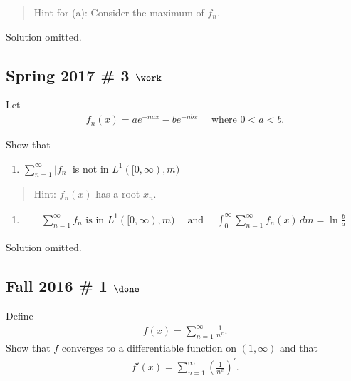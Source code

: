 \begin{quote}
Hint for (a): Consider the maximum of \(f_n\).
\end{quote}

Solution omitted.

\hypertarget{spring-2017-3-work}{%
\subsection{\texorpdfstring{Spring 2017 \# 3
\(\work\)}{Spring 2017 \# 3 \textbackslash work}}\label{spring-2017-3-work}}

Let
\begin{align*}
f_{n}(x) = a e^{-n a x} - b e^{-n b x} \quad \text{ where } 0 < a < b.
\end{align*}

Show that

\begin{enumerate}
\def\labelenumi{\alph{enumi}.}
\tightlist
\item
  \(\sum_{n=1}^{\infty} \left|f_{n}\right|\) is not in
  \(L^{1}([0, \infty), m)\)
\end{enumerate}

\begin{quote}
Hint: \(f_n(x)\) has a root \(x_n\).
\end{quote}

\begin{enumerate}
\def\labelenumi{\alph{enumi}.}
\setcounter{enumi}{1}
\tightlist
\item

  \begin{align*}
  \sum_{n=1}^{\infty} f_{n} \text { is in } L^{1}([0, \infty), m) 
  {\quad \operatorname{and} \quad}
  \int _{0}^{\infty} \sum _{n=1}^{\infty} f_{n}(x) \,dm = \ln \frac{b}{a}
  \end{align*}
   
\end{enumerate}

Solution omitted.

\hypertarget{fall-2016-1-done}{%
\subsection{\texorpdfstring{Fall 2016 \# 1
\(\done\)}{Fall 2016 \# 1 \textbackslash done}}\label{fall-2016-1-done}}

Define
\begin{align*}
f(x) = \sum_{n=1}^{\infty} \frac{1}{n^{x}}.
\end{align*}
Show that \(f\) converges to a differentiable function on
\((1, \infty)\) and that
\begin{align*}
f'(x)  =\sum_{n=1}^{\infty}\left(\frac{1}{n^{x}}\right)^{\prime}.
\end{align*}

